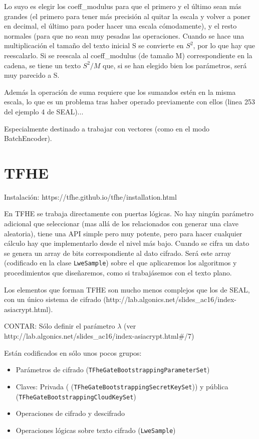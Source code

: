 \begin{itemize}
  Lo suyo es elegir los coeff\_modulus para que el primero y el último sean más grandes (el primero para tener más precisión al quitar la escala y volver a poner en decimal, el último para poder hacer una escala cómodamente), y el resto normales (para que no sean muy pesadas las operaciones. Cuando se hace una multiplicación el tamaño del texto inicial S se convierte en $S^2$, por lo que hay que reescalarlo. Si se reescala al coeff\_modulus (de tamaño M) correspondiente en la cadena, se tiene un texto $S^2/M$ que, si se han elegido bien los parámetros, será muy parecido a S.

  Además la operación de suma requiere que los sumandos estén en la misma escala, lo que es un problema tras haber operado previamente con ellos (linea 253 del ejemplo 4 de SEAL)...

  Especialmente destinado a trabajar con vectores (como en el modo BatchEncoder).

\end{itemize}

\section{TFHE}


Instalación: https://tfhe.github.io/tfhe/installation.html

En TFHE se trabaja directamente con puertas lógicas. No hay ningún parámetro adicional que seleccionar (mas allá de los relacionados con generar una clave aleatoria), tiene una API simple pero muy potente, pero para hacer cualquier cálculo hay que implementarlo desde el nivel más bajo. Cuando se cifra un dato se genera un array de bits correspondiente al dato cifrado. Será este array (codificado en la clase \verb|LweSample|) sobre el que aplicaremos los algoritmos y procedimientos que diseñaremos, como si trabajásemos con el texto plano.

Los elementos que forman TFHE son mucho menos complejos que los de SEAL, con un único sistema de cifrado (http://lab.algonics.net/slides_ac16/index-asiacrypt.html).

CONTAR: Sólo definir el parámetro $\lambda$ (ver http://lab.algonics.net/slides_ac16/index-asiacrypt.html#/7)

Están codificados en sólo unos pocos grupos:

\begin{itemize}
  \item Parámetros de cifrado (\texttt{TFheGateBootstrappingParameterSet})
  \item Claves: Privada ( (\texttt{TFheGateBootstrappingSecretKeySet})) y pública (\texttt{TFheGateBootstrappingCloudKeySet})
  \item Operaciones de cifrado y descifrado
  \item Operaciones lógicas sobre texto cifrado (\texttt{LweSample})
\end{itemize}


